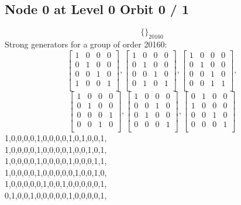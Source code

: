 \subsection*{Node 0 at Level 0 Orbit 0 / 1}
$$
\{  \}_{20160}$$
{\small\arraycolsep=2pt
Strong generators for a group of order 20160:
$$
\left[
\begin{array}{*{4}{r}}
1 & 0 & 0 & 0\\
0 & 1 & 0 & 0\\
0 & 0 & 1 & 0\\
1 & 0 & 0 & 1\\
\end{array}
\right]
, 
\left[
\begin{array}{*{4}{r}}
1 & 0 & 0 & 0\\
0 & 1 & 0 & 0\\
0 & 0 & 1 & 0\\
0 & 1 & 0 & 1\\
\end{array}
\right]
, 
\left[
\begin{array}{*{4}{r}}
1 & 0 & 0 & 0\\
0 & 1 & 0 & 0\\
0 & 0 & 1 & 0\\
0 & 0 & 1 & 1\\
\end{array}
\right]
, 
$$
$$
\left[
\begin{array}{*{4}{r}}
1 & 0 & 0 & 0\\
0 & 1 & 0 & 0\\
0 & 0 & 0 & 1\\
0 & 0 & 1 & 0\\
\end{array}
\right]
, 
\left[
\begin{array}{*{4}{r}}
1 & 0 & 0 & 0\\
0 & 0 & 1 & 0\\
0 & 1 & 0 & 0\\
0 & 0 & 0 & 1\\
\end{array}
\right]
, 
\left[
\begin{array}{*{4}{r}}
0 & 1 & 0 & 0\\
1 & 0 & 0 & 0\\
0 & 0 & 1 & 0\\
0 & 0 & 0 & 1\\
\end{array}
\right]
$$
1,0,0,0,0,1,0,0,0,0,1,0,1,0,0,1,\\
1,0,0,0,0,1,0,0,0,0,1,0,0,1,0,1,\\
1,0,0,0,0,1,0,0,0,0,1,0,0,0,1,1,\\
1,0,0,0,0,1,0,0,0,0,0,1,0,0,1,0,\\
1,0,0,0,0,0,1,0,0,1,0,0,0,0,0,1,\\
0,1,0,0,1,0,0,0,0,0,1,0,0,0,0,1,\\
}
